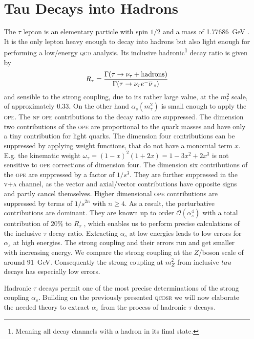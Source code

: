 \documentclass[../../index.tex]{subfiles}
\begin{document}
\chapter{Tau Decays into Hadrons}
The \(\tau\) lepton is an elementary particle with spin \(1/2\) and a mass of
\SI{1.77686}{\giga\eV} \cite{PDG2018}. It is the only lepton heavy enough to
decay into hadrons but also light enough for performing a low\-/energy
\textsc{qcd} analysis. Its inclusive hadronic\footnote{Meaning all decay
  channels with a hadron in its final state.} decay ratio is given by
\begin{equation}
  \label{eq:inclusiveRatio}
  R_\tau = \frac{\Gamma(\tau \to \nu_\tau + \text{hadrons})}{\Gamma(\tau \to \nu_\tau e^- \overline{\nu}\,_e)}
\end{equation}
and sensible to the strong coupling, due to its rather large value, at the
\(m_\tau^2\) scale, of approximately \(0.33\). On the other hand
\(\alpha_s(m_\tau^2)\) is small enough to apply the \textsc{ope}. The
\textsc{np} \textsc{ope} contributions to the decay ratio are suppressed. The
dimension two contributions of the \textsc{ope} are proportional to the quark
masses and have only a tiny contribution for light quarks. The dimension four
contributions can be suppressed by applying weight functions, that do not have a
monomial term \(x\). E.g. the kinematic weight
\(\omega_\tau=(1-x)^2(1+2x)=1-3x^2+2x^3\) is not sensitive to \textsc{ope}
corrections of dimension four. The dimension six contributions of the
\textsc{ope} are suppressed by a factor of \(1/s^3\). They are further
suppressed in the \textsc{v+a} channel, as the vector and axial\-/vector
contributions have opposite signs and partly cancel themselves. Higher
dimensional \textsc{ope} contributions are suppressed by terms of \(1/s^{2n}\)
with \(n \geq 4\). As a result, the perturbative contributions are dominant.
They are known up to order \(\mathcal{O}(\alpha_s^4)\) with a total contribution
of \(20\%\) to \(R_\tau\) \cite{Pich2016a}, which enables us to perform precise
calculations of the inclusive \(\tau\) decay ratio. Extracting \(\alpha_s\) at
low energies leads to low errors for \(\alpha_s\) at high energies. The strong
coupling and their errors run and get smaller with increasing energy. We compare
the strong coupling at the \(Z\)\-/boson scale of around \SI{91}{\giga\eV}.
Consequently the strong coupling at \(m_Z^2\) from inclusive \(tau\) decays has
especially low errors.

Hadronic \(\tau\) decays permit one of the most precise determinations of the
strong coupling \(\alpha_s\). Building on the previously presented
\textsc{qcdsr} we will now elaborate the needed theory to extract \(\alpha_s\)
from the process of hadronic \(\tau\) decays.
\end{document}
